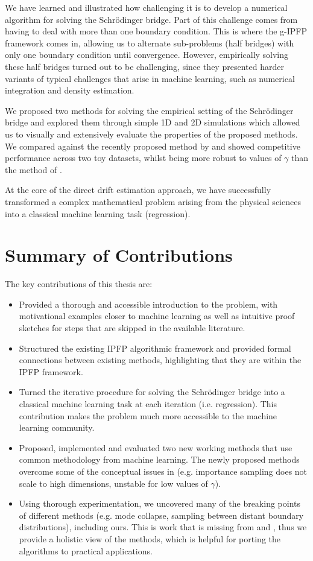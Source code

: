 \documentclass[a4paper,12pt,twoside,openright]{report}
\theoremstyle{definition}
\begin{document}
We have learned and illustrated how challenging it is to develop a numerical algorithm for solving the Schrödinger bridge. Part of this challenge comes from having to deal with more than one boundary condition. This is where the g-IPFP framework comes in, allowing us to alternate sub-problems (half bridges) with only one boundary condition until convergence. However, empirically solving these half bridges turned out to be challenging, since they presented harder variants of typical challenges that arise in machine learning, such as numerical integration and density estimation.

We proposed two methods for solving the empirical setting of the Schrödinger bridge and explored them through simple 1D and 2D simulations which allowed us to visually and extensively evaluate the properties of the proposed methods.  We compared against the recently proposed method by \cite{pavon2018data} and showed competitive performance across two toy datasets, whilst being more robust to values of $\gamma$ than the method of \citep{pavon2018data}.

At the core of the direct drift estimation approach, we have successfully transformed a complex mathematical problem arising from the physical sciences into a classical machine learning task (regression).

\section{Summary of Contributions}

The key contributions of this thesis are:

\begin{itemize}
    \item Provided a thorough and accessible introduction to the problem, with motivational examples closer to machine learning as well as intuitive proof sketches for steps that are skipped in the available literature.
    \item Structured the existing IPFP algorithmic framework and provided formal connections between existing methods, highlighting that they are within the IPFP framework.
    \item Turned the iterative procedure for solving the Schrödinger bridge into a classical machine learning task at each iteration (i.e. regression). This contribution makes the problem much more accessible to the machine learning community.
    \item Proposed, implemented and evaluated two new working methods that use common methodology from machine learning. The newly proposed methods overcome some of the conceptual issues in \cite{pavon2018data} (e.g. importance sampling does not scale to high dimensions, unstable for low values of $\gamma$).
    \item Using thorough experimentation, we uncovered many of the breaking points of different methods (e.g. mode collapse, sampling between distant boundary distributions), including ours. This is work that is missing from \cite{pavon2018data} and \cite{bernton2019schr}, thus we provide a holistic view of the methods, which is helpful for porting the algorithms to practical applications.
\end{itemize}
\end{document}
